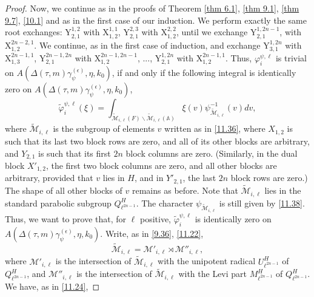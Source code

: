 \documentclass[12pts]{amsart}
\newcommand{\BA}{{\mathbb {A}}}
\begin{document}
\begin{proof}
Now, we continue as in the proofs of Theorem \ref{thm 6.1}, \ref{thm 9.1},  \ref{thm 9.7}, \ref{10.1} and as in the first case of our induction.
We perform exactly the same root exchanges: $\mathrm{Y}_{2,1}^{1,2}$ with $\mathrm{X}_{1,2}^{1,1}$, $\mathrm{Y}_{2,1}^{2,3}$ with $\mathrm{X}_{1,2}^{2,2}$, until we exchange $\mathrm{Y}_{2,1}^{1,2n-1}$, with $\mathrm{X}_{1,2}^{2n-2,1}$. We continue, as in the first case of induction, and exchange $\mathrm{Y}_{3,1}^{1,2n}$ with $\mathrm{X}_{1,3}^{2n-1,1}$, $\mathrm{Y}_{2,1}^{2n-1,2n}$ with $\mathrm{X}_{1,2}^{2n-1,2n-1}$, ..., $\mathrm{Y}_{2,1}^{1,2n}$ with $\mathrm{X}_{1,2}^{2n-1,1}$. Thus, $\varphi_{i}^{\psi,\ell}$ is trivial on $A(\Delta(\tau,m)\gamma_\psi^{(\epsilon)},\eta,k_0)$, if and only if the following integral is identically zero on $A(\Delta(\tau,m)\gamma_\psi^{(\epsilon)},\eta,k_0)$, 
 \begin{equation}\label{11.39}
 \tilde{\varphi}_{i}^{\psi,\ell}(\xi)=
 \int_{\tilde{\mathcal{M}}_{i,\ell}(F)\backslash
 	\tilde{\mathcal{M}}_{i,\ell}(\BA)}\xi(v)\psi^{-1}_{\tilde{\mathcal{M}}_{i,\ell}}(v)dv, 
 \end{equation}
 where $\tilde{\mathcal{M}}_{i,\ell}$ is the subgroup of elements $v$ written as in \eqref{11.36}, where $X_{1,2}$ is such that its last two block rows are zero, and all of its other blocks are arbitrary, and $Y_{2,1}$ is such that its first $2n$ block columns are zero. (Similarly, in the dual block $X'_{1,2}$, the first two block columns are zero, and all other blocks are arbitrary, provided that $v$ lies in $H$, and in $Y'_{2,1}$, the last $2n$ block rows are zero.) The shape of all other blocks of $v$ remains as before. Note that $\tilde{\mathcal{M}}_{i,\ell}$ lies in the standard parabolic subgroup $Q^H_{\ell^{2n-1}}$.  The character $\psi_{\tilde{\mathcal{M}}_{i,\ell}}$ is still given by \eqref{11.38}. Thus, we want to prove that, for $\ell$ positive, $\tilde{\varphi}_{i}^{\psi,\ell}$ is identically zero on $A(\Delta(\tau,m)\gamma_\psi^{(\epsilon)},\eta,k_0)$.  
 Write, as in \eqref{9.36}, \eqref{11.22},
 \begin{equation}\label{11.40}
 \tilde{\mathcal{M}}_{i,\ell}=\mathcal{M}'_{i,\ell}\rtimes\mathcal{M}''_{i,\ell},
 \end{equation}
 where $\mathcal{M}'_{i,\ell}$ is the intersection of $\tilde{\mathcal{M}}_{i,\ell}$ with the unipotent radical $U^H_{\ell^{2n-1}}$ of $Q^H_{\ell^{2n-1}}$, and $\mathcal{M}''_{i,\ell}$ is the intersection of $\tilde{\mathcal{M}}_{i,\ell}$ with the Levi part $M^H_{\ell^{2n-1}}$ of $Q^H_{\ell^{2n-1}}$. We have, as in \eqref{11.24},

\end{proof}
\end{document}

